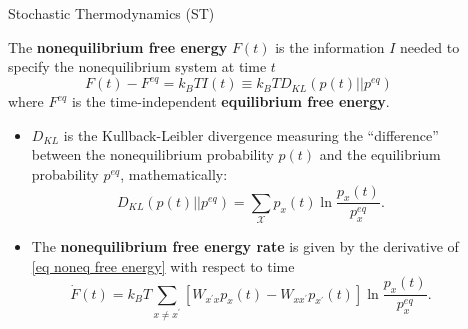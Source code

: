 \documentclass[final]{beamer}
\newlength{\sepwidth}
\newlength{\colwidth}
\newcommand{\separatorcolumn}{\begin{column}{\sepwidth}\end{column}}
\begin{document}
\begin{frame}[t]
\begin{columns}[t]
\begin{column}{\colwidth}
\begin{block}{Stochastic Thermodynamics (ST)}
\begin{itemize}
\end{itemize}

The {\bf nonequilibrium free energy} ${F}(t)$ is the information $I$ needed to specify the nonequilibrium system at time $t$\cite{Esposito_2011}
%
\begin{equation}
{F}(t) - {F}^{eq} = k_B TI(t) \equiv k_B TD_{KL}(p(t) || p^{eq})
\label{eq noneq free energy}
\end{equation}
%
where ${F}^{eq}$ is the time-independent {\bf equilibrium free energy}.
\begin{itemize}
\justifying
\item $D_{KL}$ is the Kullback-Leibler divergence measuring the ``difference'' between the nonequilibrium probability $p(t)$ and the equilibrium probability $p^{eq}$, mathematically:
%
\begin{equation*}
D_{KL}(p(t) || p^{eq}) = \sum_{\mathcal{X}} p_x(t) \ln \frac{p_x(t)}{p_x^{eq}}.
\end{equation*}
\item The {\bf nonequilibrium free energy rate} is given by the derivative of \eqref{eq noneq free energy} with respect to time 
\begin{equation*}
\dot{F}(t) = k_B T \sum_{x \neq x^\prime} \left[ W_{x^\prime x} p_x(t) -  W_{x x^\prime}p_{x^\prime}(t) \right] \ln \frac{p_x(t)}{p_x^{eq}}.
\end{equation*}
\end{itemize}
\end{block}
\end{column}

\separatorcolumn

\begin{column}{\colwidth}



\end{column}
\end{columns}
\end{frame}
\end{document}
